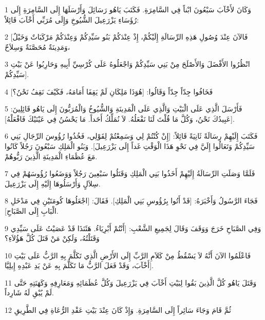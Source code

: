 \par 1 وَكَانَ لأَخْآبَ سَبْعُونَ ابْناً فِي السَّامِرَةِ. فَكَتَبَ يَاهُو رَسَائِلَ وَأَرْسَلَهَا إِلَى السَّامِرَةِ إِلَى رُؤَسَاءِ يَزْرَعِيلَ الشُّيُوخِ وَإِلَى مُرَبِّي أَخْآبَ قَائِلاً:
\par 2 [فَالآنَ عِنْدَ وُصُولِ هَذِهِ الرِّسَالَةِ إِلَيْكُمْ، إِذْ عِنْدَكُمْ بَنُو سَيِّدِكُمْ وَعِنْدَكُمْ مَرْكَبَاتٌ وَخَيْلٌ وَمَدِينَةٌ مُحَصَّنَةٌ وَسِلاَحٌ،
\par 3 انْظُرُوا الأَفْضَلَ وَالأَصْلَحَ مِنْ بَنِي سَيِّدِكُمْ وَاجْعَلُوهُ عَلَى كُرْسِيِّ أَبِيهِ وَحَارِبُوا عَنْ بَيْتِ سَيِّدِكُمْ].
\par 4 فَخَافُوا جِدّاً جِدّاً وَقَالُوا: [هُوَذَا مَلِكَانِ لَمْ يَقِفَا أَمَامَهُ، فَكَيْفَ نَقِفُ نَحْنُ؟]
\par 5 فَأَرْسَلَ الَّذِي عَلَى الْبَيْتِ وَالَّذِي عَلَى الْمَدِينَةِ وَالشُّيُوخُ وَالْمُرَبُّونَ إِلَى يَاهُو قَائِلِينَ: [عَبِيدُكَ نَحْنُ، وَكُلَّ مَا قُلْتَ لَنَا نَفْعَلُهُ. لاَ نُمَلِّكُ أَحَداً. مَا يَحْسُنُ فِي عَيْنَيْكَ فَافْعَلْهُ].
\par 6 فَكَتَبَ إِلَيْهِمْ رِسَالَةً ثَانِيَةً قَائِلاً: [إِنْ كُنْتُمْ لِي وَسَمِعْتُمْ لِقَوْلِي، فَخُذُوا رُؤُوسَ الرِّجَالِ بَنِي سَيِّدِكُمْ وَتَعَالُوا إِلَيَّ فِي نَحْوِ هَذَا الْوَقْتِ غَداً إِلَى يَزْرَعِيلَ]. وَبَنُو الْمَلِكِ سَبْعُونَ رَجُلاً كَانُوا مَعَ عُظَمَاءِ الْمَدِينَةِ الَّذِينَ رَبُّوهُمْ.
\par 7 فَلَمَّا وَصَلَتِ الرِّسَالَةُ إِلَيْهِمْ أَخَذُوا بَنِي الْمَلِكِ وَقَتَلُوا سَبْعِينَ رَجُلاً وَوَضَعُوا رُؤُوسَهُمْ فِي سِلاَلٍ وَأَرْسَلُوهَا إِلَيْهِ إِلَى يَزْرَعِيلَ.
\par 8 فَجَاءَ الرَّسُولُ وَأَخْبَرَهُ: [قَدْ أَتُوا بِرُؤُوسِ بَنِي الْمَلِكِ]. فَقَالَ: [اجْعَلُوهَا كُومَتَيْنِ فِي مَدْخَلِ الْبَابِ إِلَى الصَّبَاحِ].
\par 9 وَفِي الصَّبَاحِ خَرَجَ وَوَقَفَ وَقَالَ لِجَمِيعِ الشَّعْبِ: [أَنْتُمْ أَبْرِيَاءُ. هَئَنَذَا قَدْ عَصَيْتُ عَلَى سَيِّدِي وَقَتَلْتُهُ، وَلَكِنْ مَنْ قَتَلَ كُلَّ هَؤُلاَءِ؟
\par 10 فَاعْلَمُوا الآنَ أَنَّهُ لاَ يَسْقُطُ مِنْ كَلاَمِ الرَّبِّ إِلَى الأَرْضِ الَّذِي تَكَلَّمَ بِهِ الرَّبُّ عَلَى بَيْتِ أَخْآبَ، وَقَدْ فَعَلَ الرَّبُّ مَا تَكَلَّمَ بِهِ عَنْ يَدِ عَبْدِهِ إِيلِيَّا].
\par 11 وَقَتَلَ يَاهُو كُلَّ الَّذِينَ بَقُوا لِبَيْتِ أَخْآبَ فِي يَزْرَعِيلَ وَكُلَّ عُظَمَائِهِ وَمَعَارِفِهِ وَكَهَنَتِهِ حَتَّى لَمْ يُبْقِ لَهُ شَارِداً.
\par 12 ثُمَّ قَامَ وَجَاءَ سَائِراً إِلَى السَّامِرَةِ. وَإِذْ كَانَ عِنْدَ بَيْتِ عَقْدِ الرُّعَاةِ فِي الطَّرِيقِ
